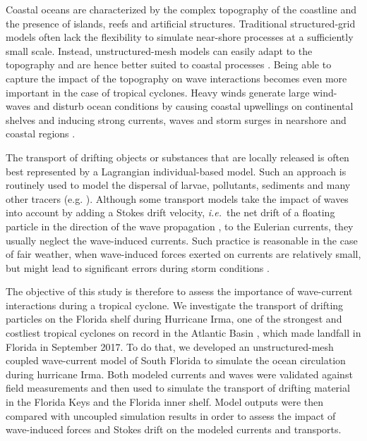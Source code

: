 \documentclass[preprint,12pt,authoryear]{elsarticle}
\newcommand{\ie}{{\it i.e.}\ }
\begin{document}
Coastal oceans are characterized by the complex topography of the coastline and the presence of islands, reefs and artificial structures. Traditional structured-grid models often lack the flexibility to simulate near-shore processes at a sufficiently small scale. Instead, unstructured-mesh models can easily adapt to the topography and are hence better suited to coastal processes \citep{fringer2019future}. Being able to capture the impact of the topography on wave interactions becomes even more important in the case of tropical cyclones. Heavy winds generate large wind-waves and disturb ocean conditions \citep{liu2020impacts} by causing coastal upwellings on continental shelves \citep{smith1982response} and inducing strong currents, waves and storm surges in nearshore and coastal regions \citep{dietrich2010high, weisberg2006hurricane}. 

The transport of drifting objects or substances that are locally released is often best represented by a Lagrangian individual-based model. Such an approach is routinely used to model the dispersal of larvae, pollutants, sediments and many other tracers (e.g. \citealp{le2012surface,liubartseva2018tracking, figueiredo2013synthesizing,frys2020fine}). Although some transport models take the impact of waves into account by adding a Stokes drift velocity, \ie the net drift of a floating particle in the direction of the wave propagation \citep{van2018stokes}, to the Eulerian currents, they usually neglect the wave-induced currents. Such practice is reasonable in the case of fair weather, when wave-induced forces exerted on currents are relatively small, but might lead to significant errors during storm conditions \citep{rohrs2012observation,curcic2016hurricane}. 

The objective of this study is therefore to assess the importance of wave-current interactions during a tropical cyclone. We investigate the transport of drifting particles on the Florida shelf during Hurricane Irma, one of the strongest and costliest tropical cyclones on record in the Atlantic Basin \citep{xian2018brief}, which made landfall in Florida in September 2017. To do that, we developed an unstructured-mesh coupled wave-current model of South Florida to simulate the ocean circulation during hurricane Irma. Both modeled currents and waves were validated against field measurements and then used to simulate the transport of drifting material in the Florida Keys and the Florida inner shelf. Model outputs were then compared with uncoupled simulation results in order to assess the impact of wave-induced forces and Stokes drift on the modeled currents and transports.  
\end{document}
